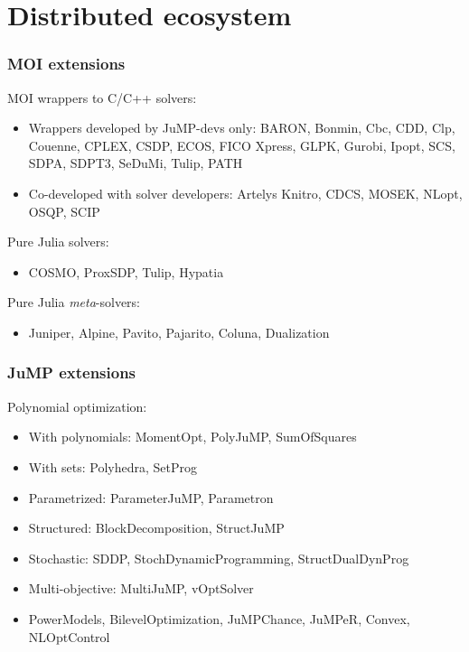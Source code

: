 \documentclass{beamer}
\begin{document}
\section{Distributed ecosystem}

\begin{frame}
  \frametitle{MOI extensions}
  MOI wrappers to C/C++ solvers:
  \begin{itemize}
    \item Wrappers developed by JuMP-devs only: BARON, Bonmin, Cbc, CDD, Clp, Couenne, CPLEX, CSDP, ECOS, FICO Xpress, GLPK, Gurobi, Ipopt, SCS, SDPA, SDPT3, SeDuMi, Tulip, PATH
    \item Co-developed with solver developers: Artelys Knitro, CDCS, MOSEK, NLopt, OSQP, SCIP
  \end{itemize}
  Pure Julia solvers:
  \begin{itemize}
    \item COSMO, ProxSDP, Tulip, Hypatia
  \end{itemize}
  Pure Julia \emph{meta}-solvers:
  \begin{itemize}
    \item Juniper, Alpine, Pavito, Pajarito, Coluna, Dualization
  \end{itemize}
\end{frame}

\begin{frame}
  \frametitle{JuMP extensions}
  Polynomial optimization:
  \begin{itemize}
    \item With \alert{polynomials}: MomentOpt, PolyJuMP, SumOfSquares
    \item With \alert{sets}: Polyhedra, SetProg
    \item \alert{Parametrized}: ParameterJuMP, Parametron
    \item \alert{Structured}: BlockDecomposition, StructJuMP
    \item \alert{Stochastic}: SDDP, StochDynamicProgramming, StructDualDynProg
    \item \alert{Multi-objective}: MultiJuMP, vOptSolver
    \item PowerModels, BilevelOptimization, JuMPChance, JuMPeR, Convex, NLOptControl
  \end{itemize}
\end{frame}
\end{document}

